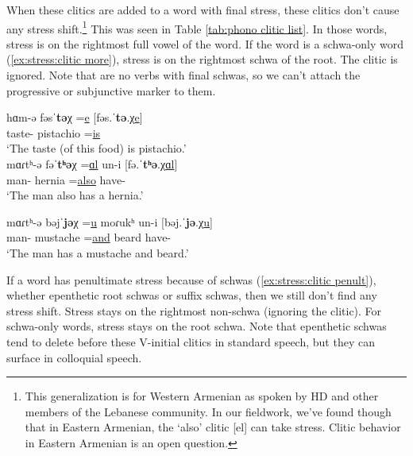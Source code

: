 When these clitics are added to a word with final stress, these clitics don't cause any stress shift.\footnote{This generalization is for Western Armenian as spoken by HD and other members of the Lebanese community. In our fieldwork, we've found though that in Eastern Armenian, the `also' clitic [el] can take stress. Clitic behavior in Eastern Armenian is an open question. } This was seen in Table \ref{tab:phono clitic list}. In those words, stress is on the rightmost full vowel of the word. If the word is a schwa-only word  (\ref{ex:stress:clitic more}), stress is on the rightmost schwa of the root. The clitic is ignored. Note that   are no verbs with final schwas,   so we can't attach the progressive or subjunctive marker to them. 

\begin{exe}
	\ex \label{ex:stress:clitic more}
	\begin{xlist}
		
		\ex \gll hɑm-ə fəsˈ\textbf{tə}χ  =\underline{e} [fəs.ˈ\textbf{tə}.χ\underline{e}]
		\\
		taste-{} pistachio =\underline{is}
		\\
		\trans `The taste (of this food) is pistachio.' 
		\\
		\ex \gll mɑɾtʰ-ə fəˈ\textbf{tʰə}χ  =\underline{ɑl} un-i [fə.ˈ\textbf{tʰə}.χ\underline{ɑl}] 
		\\
		man-{} hernia =\underline{also} have-{\thgloss} 
		\\
		\trans `The man also has a hernia.' 
		\\
		
		\ex \gll mɑɾtʰ-ə bəjˈ\textbf{jə}χ  =\underline{u} moɾukʰ un-i [bəj.ˈ\textbf{jə}.χ\underline{u}] 
		\\
		man-{} mustache =\underline{and} beard have-{\thgloss} 
		\\
		\trans `The man   has a mustache and beard.' 
		\\
	\end{xlist}
	
\end{exe}


If a word has penultimate stress because of schwas (\ref{ex:stress:clitic penult}), whether epenthetic root schwas or suffix schwas, then we still don't find any stress shift. Stress stays on the rightmost non-schwa (ignoring the clitic). For schwa-only words, stress stays on the root schwa. Note that epenthetic schwas tend to delete before these V-initial clitics in standard speech, but they can surface in colloquial speech.   

